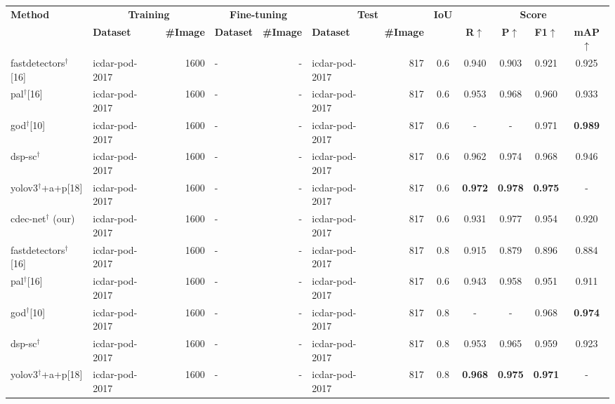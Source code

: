 \documentclass[a4paper,conference]{IEEEtran}
\begin{document}
\begin{table*}[ht!]
\addtolength{\tabcolsep}{-3.0pt}
\begin{center}
\begin{tabular}{|l| l | r|l |r|l|r| c| c c c c|} \hline
\textbf{Method} &\multicolumn{2}{|c|}{\textbf{Training}} &\multicolumn{2}{|c|}{\textbf{Fine-tuning}} &\multicolumn{2}{|c|}{\textbf{Test}} &\textbf{IoU} & \multicolumn{4}{|c|}{\textbf{Score}} \\ \cline{2-7} \cline{9-12}
  &\textbf{Dataset} &\textbf{\#Image} &\textbf{Dataset} &\textbf{\#Image} &\textbf{Dataset} &\textbf{\#Image} &  &\textbf{R}$\uparrow$ &\textbf{P}$\uparrow$ &\textbf{F1}$\uparrow$ &\textbf{mAP}$\uparrow$ \\ \hline
{\sc f}ast{\sc d}etectors$^{\dagger}$[16] &{\sc icdar-pod}-2017 &1600 &- &- &{\sc icdar-pod}-2017 &817 &0.6 &0.940 &0.903 &0.921 &0.925 \\
{\sc pal}$^{\dagger}$[16] &{\sc icdar-pod}-2017 &1600 &- &- &{\sc icdar-pod}-2017 &817 &0.6 &0.953 &0.968 &0.960 &0.933 \\ 
{\sc god}$^{\dagger}$[10] &{\sc icdar-pod}-2017 &1600 &- &- &{\sc icdar-pod}-2017 &817 &0.6 &- &- &0.971 &\textbf{0.989} \\ 
{\sc dsp-sc}$^{\dagger}$~\cite{li2018page} &{\sc icdar-pod}-2017 &1600 &- &- &{\sc icdar-pod}-2017 &817 &0.6 &0.962 &0.974 &0.968 &0.946 \\
{\sc yolo}v3$^{\dagger}$+{\sc a}+{\sc p}[18] &{\sc icdar-pod}-2017 &1600 &- &- &{\sc icdar-pod}-2017 &817 &0.6 &\textbf{0.972} &\textbf{0.978} &\textbf{0.975} &- \\ 
{\sc cd}e{\sc c-n}et$^{\dagger}$ (our) &{\sc icdar-pod}-2017 &1600 &- &- &{\sc icdar-pod}-2017 &817 &0.6 &0.931 & 0.977 & 0.954 & 0.920\\ \hhline{|=|=|=|=|=|=|=|=|====|}
{\sc f}ast{\sc d}etectors$^{\dagger}$[16] &{\sc icdar-pod}-2017 &1600 &- &- &{\sc icdar-pod}-2017 &817 &0.8 &0.915 &0.879 &0.896 &0.884 \\
{\sc pal}$^{\dagger}$[16] &{\sc icdar-pod}-2017 &1600 &- &- &{\sc icdar-pod}-2017 &817 &0.6 &0.943 &0.958 &0.951 &0.911 \\
{\sc god}$^{\dagger}$[10] &{\sc icdar-pod}-2017 &1600 &- & -&{\sc icdar-pod}-2017 &817 &0.8 &- &- &0.968 &\textbf{0.974} \\
{\sc dsp-sc}$^{\dagger}$~\cite{li2018page} &{\sc icdar-pod}-2017 &1600 &- &- &{\sc icdar-pod}-2017 &817 &0.8 &0.953 &0.965 &0.959 &0.923 \\ 
{\sc yolo}v3$^{\dagger}$+{\sc a}+{\sc p}[18] &{\sc icdar-pod}-2017 &1600 &- &- &{\sc icdar-pod}-2017 &817 &0.8 &\textbf{0.968} &\textbf{0.975} &\textbf{0.971} &- \\

\end{tabular}
\end{center}
\end{table*}
\end{document}
